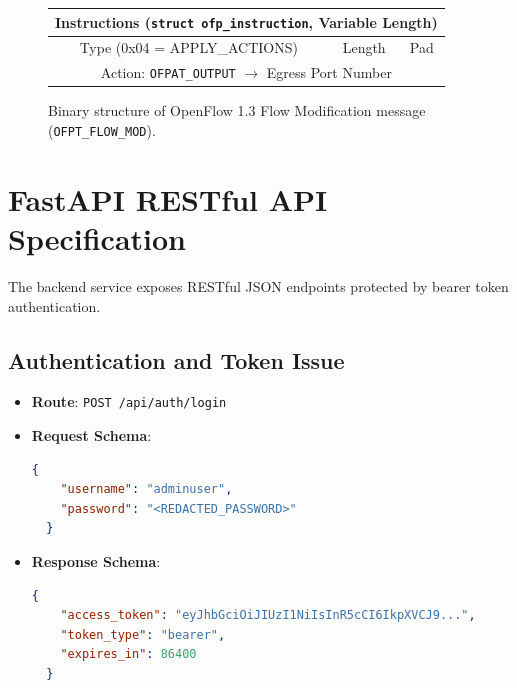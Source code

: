 \begin{figure}[H]
\begin{tabular}{|c|c|c|c|}
    \hline
    \multicolumn{4}{|c|}{\textbf{Instructions (\texttt{struct ofp\_instruction}, Variable Length)}}\\
    \hline
    Type (0x04 = APPLY\_ACTIONS) & Length & \multicolumn{2}{c|}{Pad}\\
    \hline
    \multicolumn{4}{|c|}{Action: \texttt{OFPAT\_OUTPUT} $\to$ Egress Port Number}\\
    \hline
  \end{tabular}
  \caption{Binary structure of OpenFlow 1.3 Flow Modification message (\texttt{OFPT\_FLOW\_MOD}).}
  \label{fig:ofp_flow_mod_binary}
\end{figure}

\section{FastAPI RESTful API Specification}
The backend service exposes RESTful JSON endpoints protected by bearer token authentication.

\subsection{Authentication and Token Issue}
\begin{itemize}
  \item \textbf{Route}: \texttt{POST /api/auth/login}
  \item \textbf{Request Schema}:
  \begin{lstlisting}[language=json]
  {
    "username": "adminuser",
    "password": "<REDACTED_PASSWORD>"
  }
  \end{lstlisting}
  \item \textbf{Response Schema}:
  \begin{lstlisting}[language=json]
  {
    "access_token": "eyJhbGciOiJIUzI1NiIsInR5cCI6IkpXVCJ9...",
    "token_type": "bearer",
    "expires_in": 86400
  }
  \end{lstlisting}
\end{itemize}

